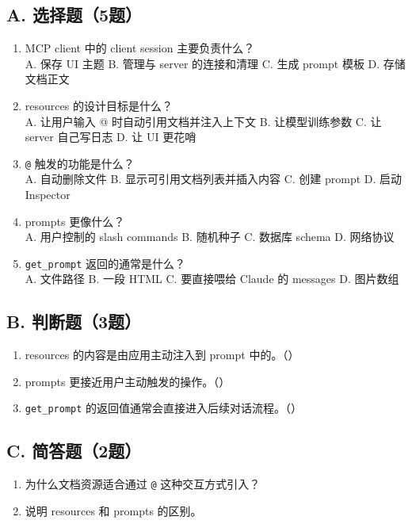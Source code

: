 \documentclass[UTF8,a4paper,11pt]{ctexart}
\begin{document}
\subsection*{A. 选择题（5题）}
\begin{enumerate}
  \item MCP client 中的 client session 主要负责什么？\\
  A. 保存 UI 主题 \quad B. 管理与 server 的连接和清理 \quad C. 生成 prompt 模板 \quad D. 存储文档正文

  \item resources 的设计目标是什么？\\
  A. 让用户输入 @ 时自动引用文档并注入上下文 \quad B. 让模型训练参数 \quad C. 让 server 自己写日志 \quad D. 让 UI 更花哨

  \item \texttt{@} 触发的功能是什么？\\
  A. 自动删除文件 \quad B. 显示可引用文档列表并插入内容 \quad C. 创建 prompt \quad D. 启动 Inspector

  \item prompts 更像什么？\\
  A. 用户控制的 slash commands \quad B. 随机种子 \quad C. 数据库 schema \quad D. 网络协议

  \item \texttt{get\_prompt} 返回的通常是什么？\\
  A. 文件路径 \quad B. 一段 HTML \quad C. 要直接喂给 Claude 的 messages \quad D. 图片数组

\end{enumerate}

\subsection*{B. 判断题（3题）}
\begin{enumerate}
  \item resources 的内容是由应用主动注入到 prompt 中的。（\quad）
  \item prompts 更接近用户主动触发的操作。（\quad）
  \item \texttt{get\_prompt} 的返回值通常会直接进入后续对话流程。（\quad）
\end{enumerate}

\subsection*{C. 简答题（2题）}
\begin{enumerate}
  \item 为什么文档资源适合通过 \texttt{@} 这种交互方式引入？
  \item 说明 resources 和 prompts 的区别。
\end{enumerate}
\end{document}
